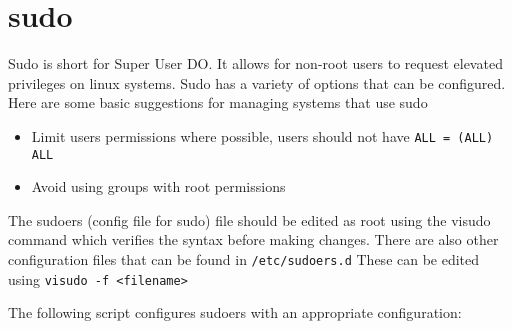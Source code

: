 \section{sudo}

Sudo is short for Super User DO.
It allows for non-root users to request elevated privileges on linux systems.
Sudo has a variety of options that can be configured.
Here are some basic suggestions for managing systems that use sudo

\begin{itemize}
	\item Limit users permissions where possible, users should not have \lstinline|ALL = (ALL) ALL|
	\item Avoid using groups with root permissions
\end{itemize}

The sudoers (config file for sudo) file should be edited as root using the visudo command which verifies the syntax before making changes.
There are also other configuration files that can be found in \lstinline|/etc/sudoers.d|
These can be edited using \lstinline|visudo -f <filename>|

The following script configures sudoers with an appropriate configuration:


